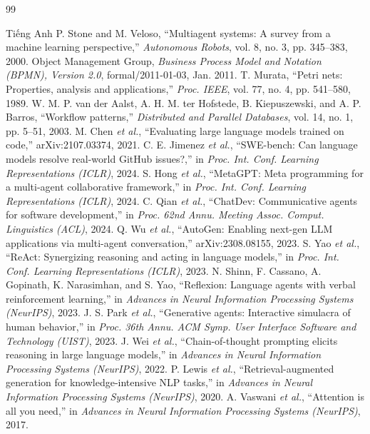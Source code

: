 \begin{thebibliography}{99}
\begin{bibsection}{Tiếng Anh}
	P. Stone and M. Veloso, ``Multiagent systems: A survey from a machine learning perspective,'' \textit{Autonomous Robots}, vol. 8, no. 3, pp. 345--383, 2000.
	Object Management Group, \textit{Business Process Model and Notation (BPMN), Version 2.0}, formal/2011-01-03, Jan. 2011.
	T. Murata, ``Petri nets: Properties, analysis and applications,'' \textit{Proc. IEEE}, vol. 77, no. 4, pp. 541--580, 1989.
	W. M. P. van der Aalst, A. H. M. ter Hofstede, B. Kiepuszewski, and A. P. Barros, ``Workflow patterns,'' \textit{Distributed and Parallel Databases}, vol. 14, no. 1, pp. 5--51, 2003.
	M. Chen \textit{et al.}, ``Evaluating large language models trained on code,'' arXiv:2107.03374, 2021.
	C. E. Jimenez \textit{et al.}, ``SWE-bench: Can language models resolve real-world GitHub issues?,'' in \textit{Proc. Int. Conf. Learning Representations (ICLR)}, 2024.
	S. Hong \textit{et al.}, ``MetaGPT: Meta programming for a multi-agent collaborative framework,'' in \textit{Proc. Int. Conf. Learning Representations (ICLR)}, 2024.
	C. Qian \textit{et al.}, ``ChatDev: Communicative agents for software development,'' in \textit{Proc. 62nd Annu. Meeting Assoc. Comput. Linguistics (ACL)}, 2024.
	Q. Wu \textit{et al.}, ``AutoGen: Enabling next-gen LLM applications via multi-agent conversation,'' arXiv:2308.08155, 2023.
	S. Yao \textit{et al.}, ``ReAct: Synergizing reasoning and acting in language models,'' in \textit{Proc. Int. Conf. Learning Representations (ICLR)}, 2023.
	N. Shinn, F. Cassano, A. Gopinath, K. Narasimhan, and S. Yao, ``Reflexion: Language agents with verbal reinforcement learning,'' in \textit{Advances in Neural Information Processing Systems (NeurIPS)}, 2023.
	J. S. Park \textit{et al.}, ``Generative agents: Interactive simulacra of human behavior,'' in \textit{Proc. 36th Annu. ACM Symp. User Interface Software and Technology (UIST)}, 2023.
	J. Wei \textit{et al.}, ``Chain-of-thought prompting elicits reasoning in large language models,'' in \textit{Advances in Neural Information Processing Systems (NeurIPS)}, 2022.
	P. Lewis \textit{et al.}, ``Retrieval-augmented generation for knowledge-intensive NLP tasks,'' in \textit{Advances in Neural Information Processing Systems (NeurIPS)}, 2020.
	A. Vaswani \textit{et al.}, ``Attention is all you need,'' in \textit{Advances in Neural Information Processing Systems (NeurIPS)}, 2017.

\end{bibsection}
\end{thebibliography}
